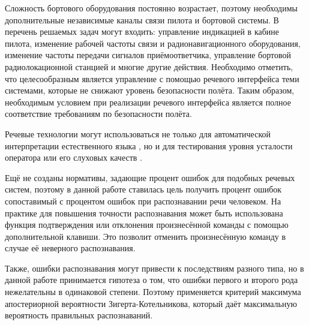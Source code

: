 Сложность бортового оборудования постоянно возрастает, поэтому необходимы дополнительные независимые каналы связи пилота и бортовой системы.
В перечень решаемых задач могут входить: управление индикацией в кабине пилота, изменение рабочей частоты связи и радионавигационного оборудования, изменение частоты передачи сигналов приёмоответчика, управление бортовой радиолокационной станцией и многие другие действия.
Необходимо отметить, что целесообразным является управление с помощью речевого интерфейса теми системами, которые не снижают уровень безопасности полёта.
Таким образом, необходимым условием при реализации речевого интерфейса является полное соответствие требованиям по безопасности полёта.

Речевые технологии могут использоваться не только для автоматической интерпретации естественного языка \cite{benesty2007springer, rabiner1979cifrovaya}, но и для тестирования уровня усталости оператора \cite{korsun2012method, bandaros2010opredelenie} или его слуховых качеств \cite{ivanov2014investigation, ivanov2017experimental}.


Ещё не созданы нормативы, задающие процент ошибок для подобных речевых систем, поэтому в данной работе ставилась цель получить процент ошибок сопоставимый с процентом ошибок при распознавании речи человеком.
На практике для повышения точности распознавания может быть использована функция подтверждения или отклонения произнесённой команды с помощью дополнительной клавиши.
Это позволит отменить произнесённую команду в случае её неверного распознавания.

Также, ошибки распознавания могут привести к последствиям разного типа, но в данной работе принимается гипотеза о том, что ошибки первого и второго рода нежелательны в одинаковой степени.
Поэтому применяется критерий максимума апостериорной вероятности Зигерта-Котельникова, который даёт максимальную вероятность правильных распознаваний.


